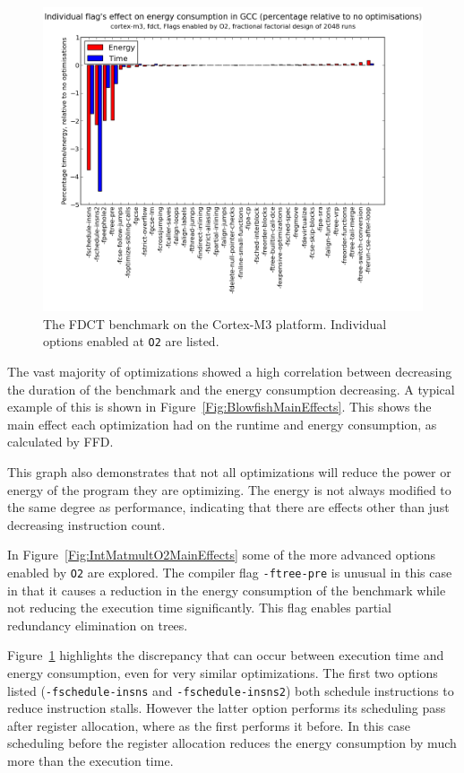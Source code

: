 \documentclass[twocolumn]{article}
\begin{document}
\begin{figure}[t]
	\includegraphics[width=\linewidth]{cortex-m3/O2_main_effects_fdct.png}
	\caption{The FDCT benchmark on the Cortex-M3 platform. Individual options enabled at \texttt{O2} are listed.}
	\label{Fig:FdctO2MainEffects}
\end{figure}

The vast majority of optimizations showed a high correlation between decreasing the duration of the benchmark and the energy consumption decreasing. A typical example of this is shown in Figure~\ref{Fig:BlowfishMainEffects}. This shows the main effect each optimization had on the runtime and energy consumption, as calculated by FFD.

This graph also demonstrates that not all optimizations will reduce the power or energy of the program they are optimizing. The energy is not always modified to the same degree as performance, indicating that there are effects other than just decreasing instruction count.

In Figure~\ref{Fig:IntMatmultO2MainEffects} some of the more advanced options enabled by \texttt{O2} are explored. The compiler flag \texttt{-ftree-pre} is unusual in this case in that it causes a reduction in the energy consumption of the benchmark while not reducing the execution time significantly. This flag enables partial redundancy elimination on trees.

Figure~\ref{Fig:FdctO2MainEffects} highlights the discrepancy that can occur between execution time and energy consumption, even for very similar optimizations. The first two options listed (\texttt{-fschedule-insns} and \texttt{-fschedule-insns2}) both schedule instructions to reduce instruction stalls. However the latter option performs its scheduling pass after register allocation, where as the first performs it before. In this case scheduling before the register allocation reduces the energy consumption by much more than the execution time.
\end{document}
